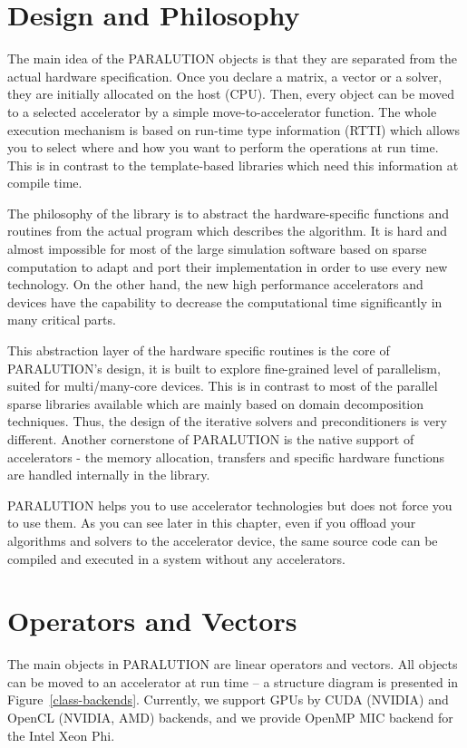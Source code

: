 \section{Design and Philosophy}

The main idea of the PARALUTION objects is that they are separated from the actual hardware specification. Once you declare a matrix, a vector or a solver, they are initially allocated on the host (CPU). Then, every object can be moved to a selected accelerator by a simple move-to-accelerator function. The whole execution mechanism is based on run-time type information (RTTI) which allows you to select where and how you want to perform the operations at run time. This is in contrast to the template-based libraries which need this information at compile time. 

The philosophy of the library is to abstract the hardware-specific functions and routines from the actual program which describes the algorithm. It is hard and almost impossible for most of the large simulation software based on sparse computation to adapt and port their implementation in order to use every new technology. On the other hand, the new high performance accelerators and devices have the capability to decrease the computational time significantly in many critical parts. 

This abstraction layer of the hardware specific routines is the core of PARALUTION's design, it is built to explore fine-grained level of parallelism, suited for multi/many-core devices. This is in contrast to most of the parallel sparse libraries available which are mainly based on domain decomposition techniques. Thus, the design of the iterative solvers and preconditioners is very different. Another cornerstone of PARALUTION is the native support of accelerators - the memory allocation, transfers and specific hardware functions are handled internally in the library.

PARALUTION helps you to use accelerator technologies but does not force you to use them. As you can see later in this chapter, even if you offload your algorithms and solvers to the accelerator device, the same source code can be compiled and executed in a system without any accelerators.

\section{Operators and Vectors}

The main objects in PARALUTION are linear operators and vectors. All objects can be moved to an accelerator at run time -- a structure diagram is presented in Figure~\ref{class-backends}. Currently, we support GPUs by CUDA (NVIDIA) and OpenCL (NVIDIA, AMD) backends, and we provide OpenMP MIC backend for the Intel Xeon Phi.


